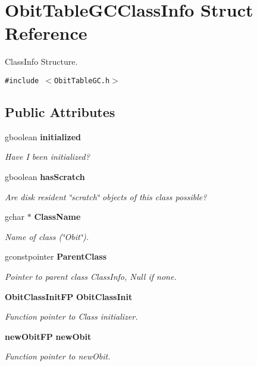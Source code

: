 \section{Obit\-Table\-GCClass\-Info Struct Reference}
\label{structObitTableGCClassInfo}
Class\-Info Structure.  


{\tt \#include $<$Obit\-Table\-GC.h$>$}

\subsection*{Public Attributes}
\begin{CompactItemize}
\item 
gboolean {\bf initialized}
\begin{CompactList}\small\item\em Have I been initialized? \item\end{CompactList}\item 
gboolean {\bf has\-Scratch}
\begin{CompactList}\small\item\em Are disk resident \char`\"{}scratch\char`\"{} objects of this class possible? \item\end{CompactList}\item 
gchar $\ast$ {\bf Class\-Name}
\begin{CompactList}\small\item\em Name of class (\char`\"{}Obit\char`\"{}). \item\end{CompactList}\item 
gconstpointer {\bf Parent\-Class}
\begin{CompactList}\small\item\em Pointer to parent class Class\-Info, Null if none. \item\end{CompactList}\item 
{\bf Obit\-Class\-Init\-FP} {\bf Obit\-Class\-Init}
\begin{CompactList}\small\item\em Function pointer to Class initializer. \item\end{CompactList}\item 
{\bf new\-Obit\-FP} {\bf new\-Obit}
\begin{CompactList}\small\item\em Function pointer to new\-Obit. \item\end{CompactList}\item 

\end{CompactItemize}
